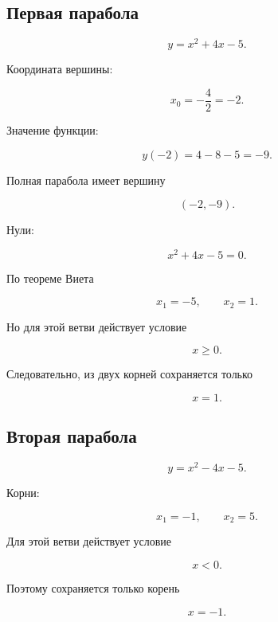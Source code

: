 \documentclass[a4paper,12pt]{article}
\begin{document}
\subsection*{Первая парабола}

\[
y=x^2+4x-5.
\]

Координата вершины:

\[
x_0=
-\frac{4}{2}
=
-2.
\]

Значение функции:

\[
y(-2)
=
4-8-5
=
-9.
\]

Полная парабола имеет вершину

\[
(-2,-9).
\]

Нули:

\[
x^2+4x-5=0.
\]

По теореме Виета

\[
x_1=-5,
\qquad
x_2=1.
\]

Но для этой ветви действует условие

\[
x\ge0.
\]

Следовательно, из двух корней сохраняется только

\[
x=1.
\]

\subsection*{Вторая парабола}

\[
y=x^2-4x-5.
\]

Корни:

\[
x_1=-1,
\qquad
x_2=5.
\]

Для этой ветви действует условие

\[
x<0.
\]

Поэтому сохраняется только корень

\[
x=-1.
\]

\begin{center}
\end{center}
\end{document}
